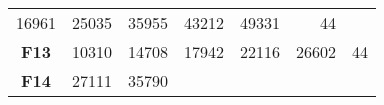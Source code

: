 \documentclass[12pt,a4paper]{article}
\begin{document}
\begin{longtable}[c]{@{}crrrrrr@{}}
\begin{minipage}[t]{0.08\columnwidth}
16961
\strut\end{minipage} &
\begin{minipage}[t]{0.08\columnwidth}\raggedleft\strut
25035
\strut\end{minipage} &
\begin{minipage}[t]{0.09\columnwidth}\raggedleft\strut
35955
\strut\end{minipage} &
\begin{minipage}[t]{0.10\columnwidth}\raggedleft\strut
43212
\strut\end{minipage} &
\begin{minipage}[t]{0.11\columnwidth}\raggedleft\strut
49331
\strut\end{minipage} &
\begin{minipage}[t]{0.07\columnwidth}\raggedleft\strut
44
\strut\end{minipage}\tabularnewline
\begin{minipage}[t]{0.11\columnwidth}\centering\strut
\textbf{F13}
\strut\end{minipage} &
\begin{minipage}[t]{0.08\columnwidth}\raggedleft\strut
10310
\strut\end{minipage} &
\begin{minipage}[t]{0.08\columnwidth}\raggedleft\strut
14708
\strut\end{minipage} &
\begin{minipage}[t]{0.09\columnwidth}\raggedleft\strut
17942
\strut\end{minipage} &
\begin{minipage}[t]{0.10\columnwidth}\raggedleft\strut
22116
\strut\end{minipage} &
\begin{minipage}[t]{0.11\columnwidth}\raggedleft\strut
26602
\strut\end{minipage} &
\begin{minipage}[t]{0.07\columnwidth}\raggedleft\strut
44
\strut\end{minipage}\tabularnewline
\begin{minipage}[t]{0.11\columnwidth}\centering\strut
\textbf{F14}
\strut\end{minipage} &
\begin{minipage}[t]{0.08\columnwidth}\raggedleft\strut
27111
\strut\end{minipage} &
\begin{minipage}[t]{0.08\columnwidth}\raggedleft\strut
35790
\strut\end{minipage} &
\begin{minipage}[t]{0.09\columnwidth}\raggedleft\strut

\end{minipage}
\end{longtable}
\end{document}
